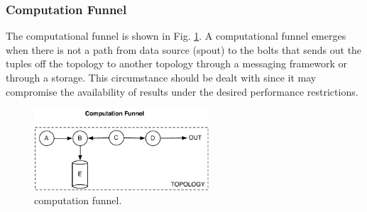 \documentclass[smallextended]{svjour3}       %
\begin{document}
\subsubsection{Computation Funnel}
The computational funnel is shown in Fig. \ref{fig:funnel}. A computational funnel emerges when there is not a path from data source (spout) to the bolts that sends out the tuples off the topology to another topology through a messaging framework or through a storage. This circumstance should be dealt with since it may compromise the availability of results under the desired performance restrictions.

\begin{figure}
	\begin{center}
		\includegraphics[width=6.5cm,draft]{fig5}
		\caption{computation funnel.}
		\label{fig:funnel}
	\end{center}
\end{figure}
\end{document}
